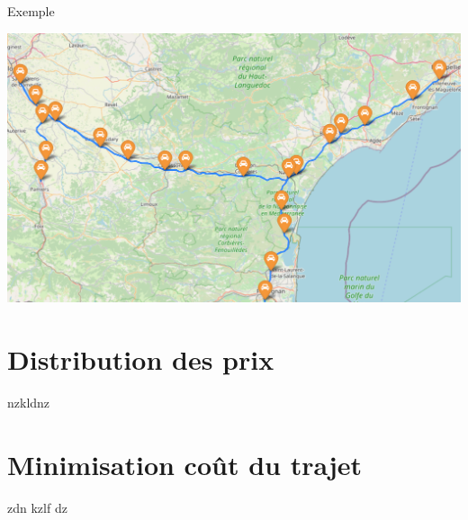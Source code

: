 \documentclass{beamer}
\begin{document}
\begin{frame}[fragile]{Exemple}
\begin{center}
\includegraphics[scale=0.3]{carte.png}
\end{center}
\end{frame}



\section{Distribution des prix}
\begin{frame}
nzkldnz
\end{frame}

\section{Minimisation coût du trajet}
\begin{frame}
zdn kzlf dz
\end{frame}
\end{document}
